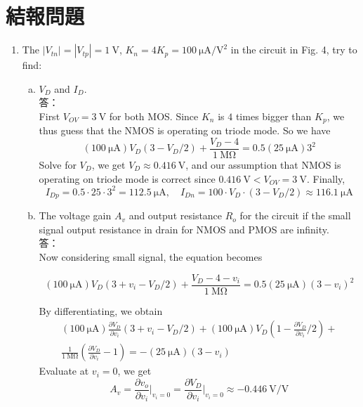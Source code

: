 \documentclass[12pt, a4paper]{article}
\begin{document}
\section{結報問題}

\begin{enumerate}[itemsep=20pt, topsep=10pt]

  \item {The $|V_{tn}| = |V_{tp}| = \SI{1}\V$, $K_n = 4K_p = \SI{100}{\micro\ampere\per\volt\squared}$
      in the circuit in Fig. 4, try to find: } \\[10pt]
    \begin{enumerate}[(a)]
      \item $V_D$ and $I_D$. \\
      答：\\
      First $V_{OV} = \SI{3}\V$ for both MOS.
      Since $K_n$ is $4$ times bigger than $K_p$, we thus guess that the NMOS is operating on
      triode mode. So we have
      \[ (\SI{100}{\micro\ampere}) V_D (3 - V_D / 2) + \frac{V_D - 4}{\SI{1}\Mohm} 
      = 0.5 (\SI{25}{\micro\ampere}) 3^2 \]
      Solve for $V_D$, we get $V_D \approx \boxed{\SI{0.416}\V}$, and our assumption that
      NMOS is operating on triode mode is correct since $\SI{0.416}\V < V_{OV} = \SI{3}\V$.
      Finally,
      \[ I_{Dp} = 0.5 \cdot 25 \cdot 3^2 = \boxed{\SI{112.5}{\micro\ampere}}, \quad 
        I_{Dn} = 100 \cdot V_D \cdot (3 - V_D/2) \approx \boxed{\SI{116.1}{\micro\ampere}} \]
      \item The voltage gain $A_v$ and output resistance $R_o$ for the circuit if the small 
        signal output resistance in drain for NMOS and PMOS are infinity.  \\
      答：\\
        Now considering small signal, the equation becomes
        
        \[ (\SI{100}{\micro\ampere}) V_D (3 + v_i - V_D / 2) + \frac{V_D - 4 - v_i}{\SI{1}\Mohm} 
        = 0.5 (\SI{25}{\micro\ampere}) (3 - v_i)^2 \]

        By differentiating, we obtain
        \begin{multline*}
        (\SI{100}{\micro\ampere}) \frac{\partial V_D}{\partial v_i}  (3 + v_i - V_D / 2) +
           (\SI{100}{\micro\ampere}) V_D  \left(1 - \frac{\partial V_D}{\partial v_i} / 2\right) + \\
           \frac{1}{\SI{1}\Mohm} \left( \frac{\partial V_D}{\partial v_i} - 1 \right) 
        = - (\SI{25}{\micro\ampere}) (3 - v_i)
        \end{multline*}
        Evaluate at $v_i = 0$, we get
        \[
          A_v = \frac{\partial v_o}{\partial v_i} \biggr|_{v_i=0}  =
          \frac{\partial V_D}{\partial v_i} \biggr|_{v_i=0} \approx \boxed{\SI{-0.446}{\volt\per\volt}}
        \]


\end{enumerate}
\end{enumerate}
\end{document}
